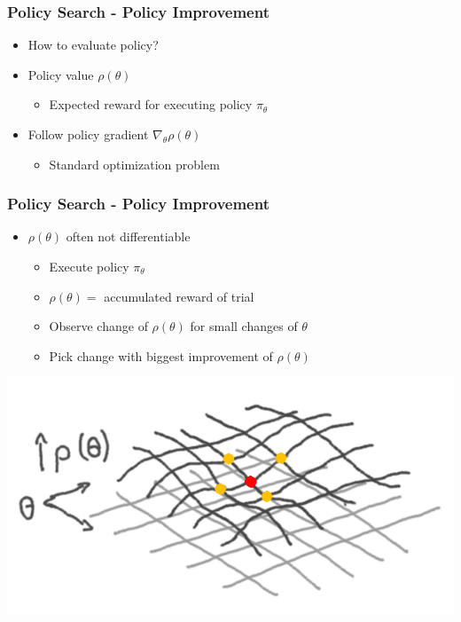 \begin{frame}
	\frametitle{Policy Search - Policy Improvement}
	\begin{itemize}
    	\item How to evaluate policy?
    	\item Policy value $\rho(\theta)$
		\begin{itemize}
    		\item Expected reward for executing policy $\pi_{\theta}$
    	\end{itemize}
    	\item Follow policy gradient $\nabla_{\theta}\rho(\theta)$
		\begin{itemize}
    		\item Standard optimization problem
    	\end{itemize}
    \end{itemize}
\end{frame}

\begin{frame}
	\frametitle{Policy Search - Policy Improvement}
	\begin{itemize}
    	\item $\rho(\theta)$ often not differentiable
		\begin{itemize}
    		\item Execute policy $\pi_{\theta}$
    		\item $\rho(\theta) = $ accumulated reward of trial
    		\item Observe change of $\rho(\theta)$ for small changes of $\theta$
    		\item Pick change with biggest improvement of $\rho(\theta)$
    	\end{itemize}
    \end{itemize}
    
	\begin{center}
		\includegraphics[width=0.6\linewidth]{img-michael/hill_climbing.png}
	\end{center}
\end{frame}

